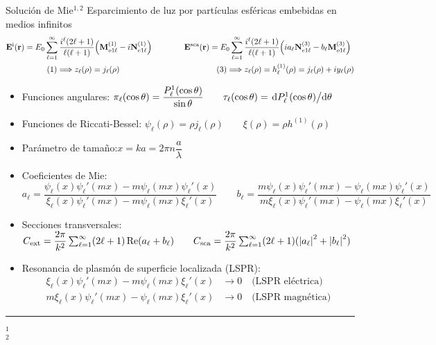 
\begin{frame}{Solución de Mie$^{1,2}$}
	{Esparcimiento de luz por partículas esféricas embebidas en medios infinitos}
	\small
	\begin{align*}
	\vb{E}^\text{i} (\vb{r})= E_0 \sum_{\ell = 1}^\infty\dfrac{i^\ell(2\ell+1)}{\ell(\ell+1)}\qty( \vb{M}_{o1\ell}^{(1)} -i \vb{N}_{e1\ell}^{(1)})
	\qquad & \qquad
	\vb{E}^\text{sca} (\vb{r}) = E_0 \sum_{\ell = 1}^\infty\dfrac{i^\ell(2\ell+1)}{\ell(\ell+1)}\qty(i a_\ell \vb{N}_{e1\ell}^{(3)} -b_\ell \vb{M}_{o1\ell}^{(3)})\\
	(1) \Longrightarrow z_\ell(\rho) = j_\ell(\rho)    \qquad\qquad \qquad & \qquad\qquad \qquad(3) \Longrightarrow z_\ell(\rho)  = h^{(1)}_\ell(\rho)  =  j_\ell(\rho)  + i y_\ell(\rho)
	\end{align*}

	\begin{itemize}
		\item Funciones angulares:\; $ \pi_\ell(\cos\theta )  = \dfrac{P_\ell^1(\cos\theta)}{\sin\theta} \qquad  \tau_\ell(\cos\theta) = \dv*{P_\ell^1(\cos\theta)}{\theta} $
		\item Funciones de Riccati-Bessel:\; $\psi_\ell(\rho) = \rho j_\ell(\rho)\qquad \xi(\rho) = \rho h^{(1)}(\rho)$
		\item Parámetro de tamaño:\;$x = k a = 2\pi n \dfrac{a}{\lambda}$
		\item Coeficientes de Mie:\; $
			a_\ell = \dfrac{\psi_\ell(x)\psi_\ell' (mx)-m\psi_\ell(mx)\psi_\ell'(x)}
				{\xi_\ell(x)\psi_\ell'(mx)-m\psi_\ell(mx)\xi_\ell'(x)}
				\qquad
	b_\ell = \dfrac{m\psi_\ell(x)\psi_\ell' (mx)-\psi_\ell(mx)\psi_\ell'(x)}
			{m\xi_\ell(x)\psi_\ell'(mx)-\psi_\ell(mx)\xi_\ell'(x)}
		$
		\item Secciones transversales: \; $C_\text{ext} = \dfrac{2 \pi}{k^2}\sum_{\ell = 1}^\infty (2 \ell + 1) \Re(a_\ell + b_\ell)
										\qquad
										C_\text{sca} = \dfrac{2 \pi}{k^2}\sum_{\ell = 1}^\infty (2 \ell + 1) (\abs{a_\ell}^2 + \abs{b_\ell}^2)$
		\item Resonancia de plasmón de superficie localizada (LSPR): %
			\begin{align*}
			\xi_\ell(x)\psi_\ell'(mx)-m\psi_\ell(mx)\xi_\ell'(x) &\to 0 \quad \text{(LSPR eléctrica)}\\
 	m\xi_\ell(x)\psi_\ell'(mx)-\psi_\ell(mx)\xi_\ell'(x) &\to 0 \quad \text{(LSPR magnética)}
			\end{align*}
	\end{itemize}


	\vspace*{0em}
	\noindent\rule{.25\textwidth}{0.4pt}
 \begin{spacing}{0}\fontsize{4}{5} \selectfont
	$^1$ \\
	$^2$ 
	\end{spacing}
\end{frame}
